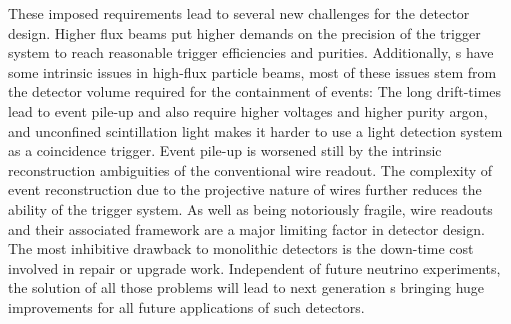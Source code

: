 These imposed requirements lead to several new challenges for the detector design.
Higher flux beams put higher demands on the precision of the trigger system to reach reasonable trigger efficiencies and purities.
Additionally, \lartpc s have some intrinsic issues in high-flux particle beams, most of these issues stem from the detector volume required for the containment of events:
The long drift-times lead to event pile-up and also require higher voltages and higher purity argon, and unconfined scintillation light makes it harder to use a light detection system as a coincidence trigger.
Event pile-up is worsened still by the intrinsic reconstruction ambiguities of the conventional wire readout.
The complexity of event reconstruction due to the projective nature of wires further reduces the ability of the trigger system.
As well as being notoriously fragile, wire readouts and their associated framework are a major limiting factor in detector design.
The most inhibitive drawback to monolithic detectors is the down-time cost involved in repair or upgrade work.
Independent of future neutrino experiments, the solution of all those problems will lead to next generation \lartpc s bringing huge improvements for all future applications of such detectors.
